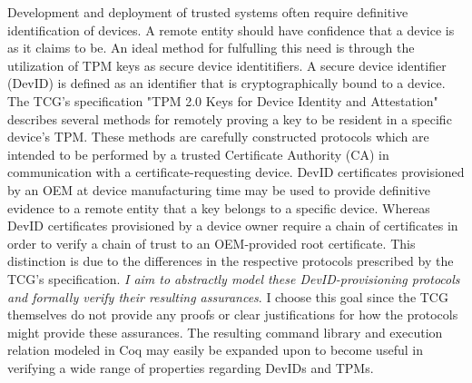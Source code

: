 \begin{abstractlong}


Development and deployment of trusted systems often require definitive identification of devices. A remote entity should have confidence that a device is as it claims to be. An ideal method for fulfulling this need is through the utilization of TPM keys as secure device identitifiers. A secure device identifier (DevID) is defined as an identifier that is cryptographically bound to a device. 
The TCG's specification "TPM 2.0 Keys for Device Identity and Attestation" describes several methods for remotely proving a key to be resident in a specific device's TPM. These methods are carefully constructed protocols which are intended to be performed by a trusted Certificate Authority (CA) in communication with a certificate-requesting device. DevID certificates provisioned by an OEM at device manufacturing time may be used to provide definitive evidence to a remote entity that a key belongs to a specific device. Whereas DevID certificates provisioned by a device owner require a chain of certificates in order to verify a chain of trust to an OEM-provided root certificate. This distinction is due to the differences in the respective protocols prescribed by the TCG's specification. \textit{I aim to abstractly model these DevID-provisioning protocols and formally verify their resulting assurances}. I choose this goal since the TCG themselves do not provide any proofs or clear justifications for how the protocols might provide these assurances. The resulting command library and execution relation modeled in Coq may easily be expanded upon to become useful in verifying a wide range of properties regarding DevIDs and TPMs.
\end{abstractlong}




\begin{acknowledgementslong}

\end{acknowledgementslong}

